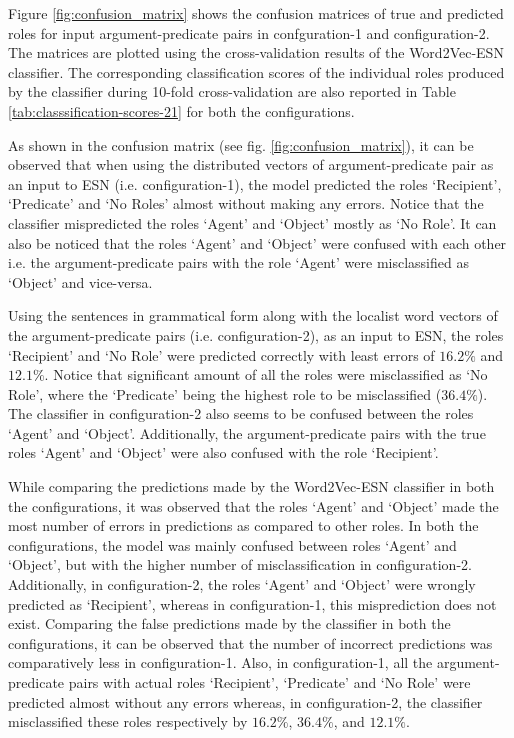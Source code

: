 Figure \ref{fig:confusion_matrix} shows the confusion matrices of true and predicted roles for input argument-predicate pairs in confguration-1 and configuration-2. The matrices are plotted using the cross-validation results of the Word2Vec-ESN classifier. The corresponding classification scores of the individual roles produced by the classifier during 10-fold cross-validation are also reported in Table \ref{tab:classsification-scores-21} for both the configurations.

As shown in the confusion matrix (see fig. \ref{fig:confusion_matrix}), it can be observed that when using the distributed vectors of argument-predicate pair as an input to ESN (i.e. configuration-1), the model predicted the roles `Recipient', `Predicate' and `No Roles' almost without making any errors. Notice that the classifier mispredicted the roles `Agent' and `Object' mostly as `No Role'. It can also be noticed that the roles `Agent' and `Object' were confused with each other i.e. the argument-predicate pairs with the role `Agent' were misclassified as `Object' and vice-versa. 

Using the sentences in grammatical form along with the localist word vectors of the argument-predicate pairs (i.e. configuration-2), as an input to ESN, the roles `Recipient' and `No Role' were predicted correctly with least errors of $16.2 \%$ and $12.1 \%$. Notice that significant amount of all the roles were misclassified as `No Role', where the `Predicate' being the highest role to be misclassified ($36.4 \%$). The classifier in configuration-2 also seems to be confused between the roles `Agent' and `Object'. Additionally, the argument-predicate pairs with the true roles `Agent' and `Object' were also confused with the role `Recipient'. 

While comparing the predictions made by the Word2Vec-ESN classifier in both the configurations, it was observed that the roles `Agent' and `Object' made the most number of errors in predictions as compared to other roles. In both the configurations, the model was mainly confused between roles `Agent' and `Object', but with the higher number of misclassification in configuration-2. Additionally, in configuration-2, the roles `Agent' and `Object' were wrongly predicted as `Recipient', whereas in configuration-1, this misprediction does not exist. Comparing the false predictions made by the classifier in both the configurations, it can be observed that the number of incorrect predictions was comparatively less in configuration-1. Also, in configuration-1, all the argument-predicate pairs with actual roles `Recipient', `Predicate' and `No Role' were predicted almost without any errors whereas, in configuration-2, the classifier misclassified these roles respectively by $16.2 \%$, $36.4\%$, and $12.1 \%$.


